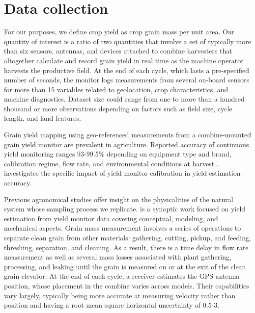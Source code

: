 \chapter{Data collection}

For our purposes, we define crop yield as crop grain mass per unit
area. Our quantity of interest is a ratio of two quantities that
involve a set of typically more than six sensors, antennas, and
devices attached to combine harvesters that altogether calculate and
record grain yield in real time as the machine operator harvests the
productive field. At the end of each cycle, which lasts a
pre-specified number of seconds, the monitor logs measurements from
several on-board sensors for more than 15 variables related to
geolocation, crop characteristics, and machine diagnostics. Dataset
size could range from one to more than a hundred thousand or more
observations depending on factors such as field size, cycle length,
and land features.

Grain yield mapping using geo-referenced measurements from a
combine-mounted grain yield monitor are prevalent in
agriculture. Reported accuracy of continuous yield monitoring ranges
93-99.5\% depending on equipment type and brand, calibration regime,
flow rate, and environmental conditions at harvest
\citep{birrellComparisonSensorsTechniques1996, Fulton2009,
  Lyle2013}. \cite{Arslan2002} investigates the specific impact of
yield monitor calibration in yield estimation accuracy.

Previous agronomical studies offer insight on the physicalities of the
natural system whose sampling process we replicate. \cite{Ross2008} is
a synoptic work focused on yield estimation from yield monitor data
covering conceptual, modeling, and mechanical aspects. Grain mass
measurement involves a series of operations to separate clean grain
from other materials: gathering, cutting, pickup, and feeding,
threshing, separation, and cleaning. As a result, there is a time
delay in flow rate measurement as well as several mass losses
associated with plant gathering, processing, and leaking until the
grain is measured on or at the exit of the clean grain elevator. At
the end of each cycle, a receiver estimates the GPS antenna position,
whose placement in the combine varies across models. Their
capabilities vary largely, typically being more accurate at measuring
velocity rather than position and having a root mean square horizontal
uncertainty of 0.5-3.

